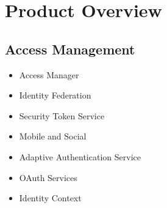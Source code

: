 
\chapter[Product Overview]{Product Overview}

\section{Access Management}




\begin{itemize}
    \item Access Manager
    \item Identity Federation
    \item Security Token Service
    \item Mobile and Social
    \item Adaptive Authentication Service
    \item OAuth Services
    \item Identity Context
\end{itemize}
